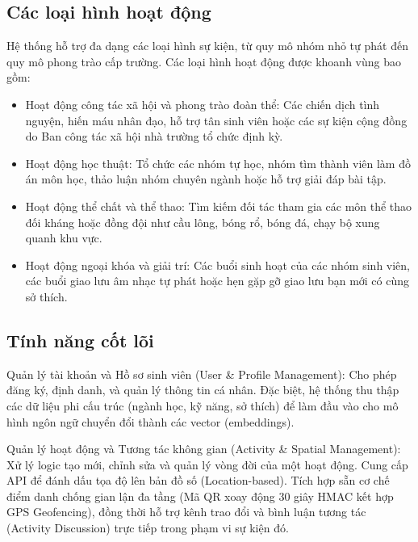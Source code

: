 \subsection{Các loại hình hoạt động}

Hệ thống hỗ trợ đa dạng các loại hình sự kiện, từ quy mô nhóm nhỏ tự phát đến quy mô phong trào cấp trường. Các loại hình hoạt động được khoanh vùng bao gồm:

\begin{itemize}
    \item Hoạt động công tác xã hội và phong trào đoàn thể: Các chiến dịch tình nguyện, hiến máu nhân đạo, hỗ trợ tân sinh viên hoặc các sự kiện cộng đồng do Ban công tác xã hội nhà trường tổ chức định kỳ.
     
    \item Hoạt động học thuật: Tổ chức các nhóm tự học, nhóm tìm thành viên làm đồ án môn học, thảo luận nhóm chuyên ngành hoặc hỗ trợ giải đáp bài tập.
    
    \item Hoạt động thể chất và thể thao: Tìm kiếm đối tác tham gia các môn thể thao đối kháng hoặc đồng đội như cầu lông, bóng rổ, bóng đá, chạy bộ xung quanh khu vực.
    
    \item Hoạt động ngoại khóa và giải trí: Các buổi sinh hoạt của các nhóm sinh viên, các buổi giao lưu âm nhạc tự phát hoặc hẹn gặp gỡ giao lưu bạn mới có cùng sở thích.
\end{itemize}

\subsection{Tính năng cốt lõi}

Quản lý tài khoản và Hồ sơ sinh viên (User \& Profile Management): Cho phép đăng ký, định danh, và quản lý thông tin cá nhân. Đặc biệt, hệ thống thu thập các dữ liệu phi cấu trúc (ngành học, kỹ năng, sở thích) để làm đầu vào cho mô hình ngôn ngữ chuyển đổi thành các vector (embeddings).

Quản lý hoạt động và Tương tác không gian (Activity \& Spatial Management): Xử lý logic tạo mới, chỉnh sửa và quản lý vòng đời của một hoạt động. Cung cấp API để đánh dấu tọa độ lên bản đồ số (Location-based). Tích hợp sẵn cơ chế điểm danh chống gian lận đa tầng (Mã QR xoay động 30 giây HMAC kết hợp GPS Geofencing), đồng thời hỗ trợ kênh trao đổi và bình luận tương tác (Activity Discussion) trực tiếp trong phạm vi sự kiện đó.

